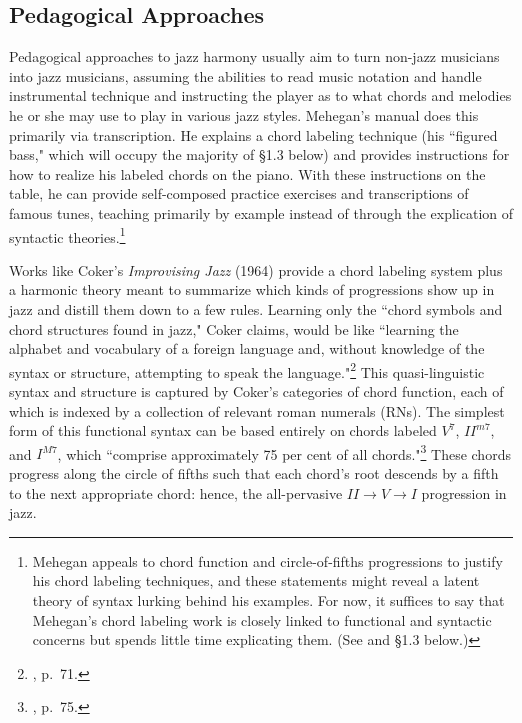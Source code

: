 \subsection{Pedagogical Approaches}
Pedagogical approaches to jazz harmony usually aim to turn non-jazz musicians into jazz musicians, assuming the abilities to read music notation and handle instrumental technique and instructing the player as to what chords and melodies he or she may use to play in various jazz styles.  Mehegan's manual does this primarily via transcription.  He explains a chord labeling technique (his ``figured bass," which will occupy the majority of \S 1.3 below) and provides instructions for how to realize his labeled chords on the piano.  With these instructions on the table, he can provide self-composed practice exercises and transcriptions of famous tunes, teaching primarily by example instead of through the explication of syntactic theories.\footnote{Mehegan appeals to chord function and circle-of-fifths progressions to justify his chord labeling techniques, and these statements might reveal a latent theory of syntax lurking behind his examples.  For now, it suffices to say that Mehegan's chord labeling work is closely linked to functional and syntactic concerns but spends little time explicating them.  (See \cite{mehegan1959} and \S 1.3 below.)}

Works like Coker's \emph{Improvising Jazz} (1964) provide a chord labeling system plus a harmonic theory meant to summarize which kinds of progressions show up in jazz and distill them down to a few rules.  Learning only the ``chord symbols and chord structures found in jazz," Coker claims, would be like ``learning the alphabet and vocabulary of a foreign language and, without knowledge of the syntax or structure, attempting to speak the language."\footnote{\cite{coker1964}, p.\ 71.}  This quasi-linguistic syntax and structure is captured by Coker's categories of chord function, each of which is indexed by a collection of relevant roman numerals (RNs).  The simplest form of this functional syntax can be based entirely on chords labeled $V^{7}$, $II^{m7}$, and $I^{M7}$, which ``comprise approximately 75 per cent of all chords."\footnote{\cite{coker1964}, p.\ 75.}  These chords progress along the circle of fifths such that each chord's root descends by a fifth to the next appropriate chord: hence, the all-pervasive $II \rightarrow V \rightarrow I$ progression in jazz.

